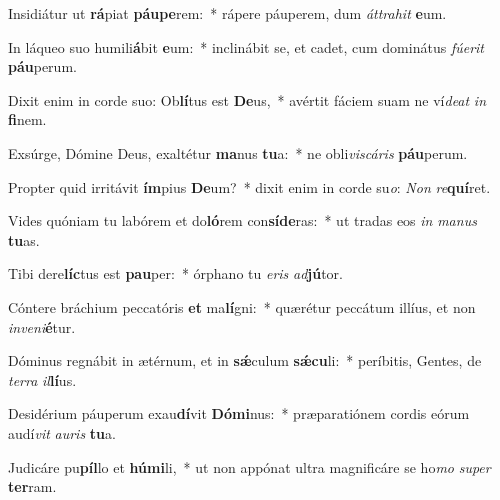 \item Insidiátur ut \textbf{rá}piat \textbf{páu}\textbf{pe}rem:~* rápere páuperem, dum \textit{át}\textit{tra}\textit{hit} \textbf{e}um.
\item In láqueo suo humili\textbf{á}bit \textbf{e}um:~* inclinábit se, et cadet, cum dominátus \textit{fú}\textit{e}\textit{rit} \textbf{páu}perum.
\item Dixit enim in corde suo: Ob\textbf{lí}tus est \textbf{De}us,~* avértit fáciem suam ne ví\textit{de}\textit{at} \textit{in} \textbf{fi}nem.
\item Exsúrge, Dómine Deus, exaltétur \textbf{ma}nus \textbf{tu}a:~* ne obli\textit{vis}\textit{cá}\textit{ris} \textbf{páu}perum.
\item Propter quid irritávit \textbf{ím}pius \textbf{De}um?~* dixit enim in corde su\textit{o}: \textit{Non} \textit{re}\textbf{quí}ret.
\item Vides quóniam tu labórem et do\textbf{ló}rem con\textbf{sí}\textbf{de}ras:~* ut tradas eos \textit{in} \textit{ma}\textit{nus} \textbf{tu}as.
\item Tibi dere\textbf{líc}tus est \textbf{pau}per:~* órphano tu \textit{e}\textit{ris} \textit{ad}\textbf{jú}tor.
\item Cóntere bráchium peccatóris \textbf{et} ma\textbf{lí}gni:~* quærétur peccátum illíus, et non \textit{in}\textit{ve}\textit{ni}\textbf{é}tur.
\item Dóminus regnábit in ætérnum, et in \textbf{sǽ}culum \textbf{sǽ}\textbf{cu}li:~* períbitis, Gentes, de \textit{ter}\textit{ra} \textit{il}\textbf{lí}us.
\item Desidérium páuperum exau\textbf{dí}vit \textbf{Dó}\textbf{mi}nus:~* præparatiónem cordis eórum audí\textit{vit} \textit{au}\textit{ris} \textbf{tu}a.
\item Judicáre pu\textbf{píl}lo et \textbf{hú}\textbf{mi}li,~* ut non appónat ultra magnificáre se ho\textit{mo} \textit{su}\textit{per} \textbf{ter}ram.
